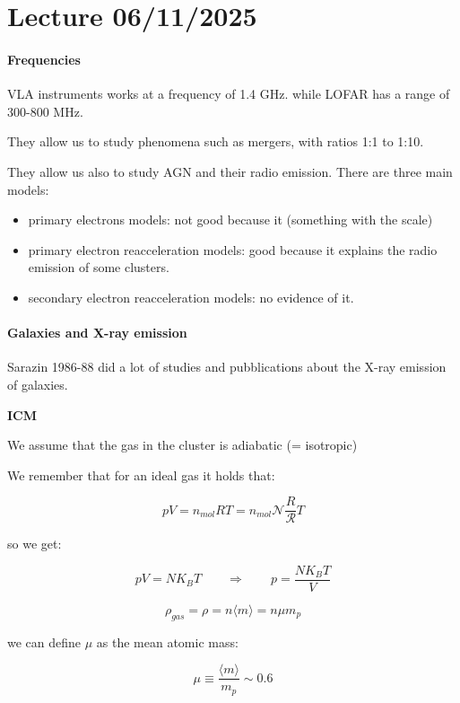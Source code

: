 
\chapter{Lecture 06/11/2025}

\subsubsection{Frequencies}

VLA instruments works at a frequency of 1.4 GHz. while LOFAR has a range of 300-800 MHz.

They allow us to study phenomena such as mergers, with ratios 1:1 to 1:10.

They allow us also to study AGN and their radio emission. There are three main models:

\begin{itemize}
    \item primary electrons models: not good because it (something with the scale)
    \item primary electron reacceleration models: good because it explains the radio emission of some clusters.
    \item secondary electron reacceleration models: no evidence of it.
\end{itemize}

\subsubsection{Galaxies and X-ray emission} %

Sarazin 1986-88 did a lot of studies and pubblications about the X-ray emission of galaxies.

\textbf{ICM}

We assume that the gas in the cluster is adiabatic (= isotropic)

We remember that for an ideal gas it holds that:

$$
pV = n_{mol} R T = n_{mol} \mathcal{N} \dfrac R{\mathcal R} T
$$

so we get:

$$
pV = N K_B T \qquad \Rightarrow \qquad p = \dfrac{N K_B T}{V}
$$


$$
\rho_{gas} = \rho = n \langle m \rangle = n \mu m_p
$$

we can define $\mu$ as the mean atomic mass:

$$
\mu \equiv \dfrac{\langle m \rangle}{m_p} \sim 0.6
$$

